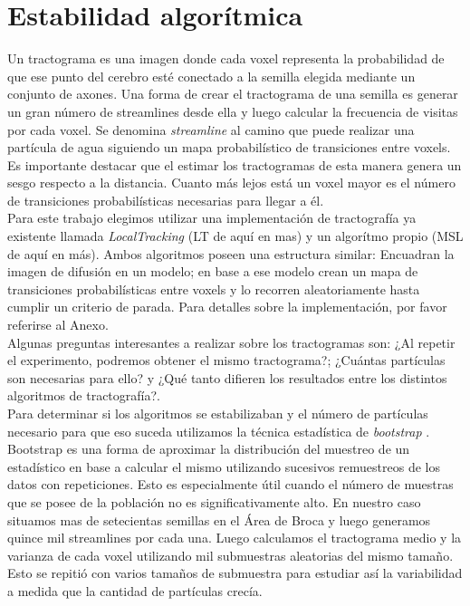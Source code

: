 \section{Estabilidad algor\'itmica}
\label{sec:estabilidad}

Un tractograma es una imagen donde cada voxel representa la probabilidad de que
ese punto del cerebro est\'e conectado a la semilla elegida mediante un conjunto
de axones. Una forma de crear el tractograma de una semilla es generar un gran
n\'umero de streamlines desde ella y luego calcular la frecuencia de visitas por
cada voxel. Se denomina \textit{streamline} al camino que puede realizar una
part\'icula de agua siguiendo un mapa probabil\'istico de transiciones entre voxels.
Es importante destacar que el estimar los tractogramas de esta manera genera un 
sesgo respecto a la distancia. Cuanto m\'as lejos est\'a un voxel mayor es el 
n\'umero de transiciones probabil\'isticas necesarias para llegar a \'el. \\

Para este trabajo elegimos utilizar una implementaci\'on de tractograf\'ia ya 
existente llamada \textit{LocalTracking} (LT de aqu\'i en mas) y un algor\'itmo
propio (MSL de aqu\'i en m\'as). Ambos algoritmos poseen una estructura 
similar: Encuadran la imagen de difusi\'on en un modelo; en base a ese modelo 
crean un mapa de transiciones probabil\'isticas entre voxels y lo recorren 
aleatoriamente hasta cumplir un criterio de parada. Para detalles sobre la 
implementaci\'on, por favor referirse al Anexo. \\

Algunas preguntas interesantes a realizar sobre los tractogramas son: ¿Al repetir
el experimento, podremos obtener el mismo tractograma?; ¿Cu\'antas part\'iculas son
necesarias para ello? y ¿Qu\'e tanto difieren los resultados entre los distintos 
algoritmos de tractograf\'ia?. \\

Para determinar si los algoritmos se estabilizaban y el n\'umero de part\'iculas
necesario para que eso suceda utilizamos la t\'ecnica estad\'istica de
\textit{bootstrap} \cite{Efron1982}. Bootstrap es una forma de aproximar la
distribuci\'on del muestreo de un estad\'istico en base a calcular el mismo
utilizando sucesivos remuestreos de los datos con repeticiones. Esto es
especialmente \'util cuando el n\'umero de muestras que se posee de la poblaci\'on
no es significativamente alto. En nuestro caso situamos mas de setecientas
semillas en el \'Area de Broca y luego generamos quince mil streamlines por cada
una. Luego calculamos el tractograma medio y la varianza de cada voxel utilizando
mil submuestras aleatorias del mismo tama\~no. Esto se repiti\'o con varios
tama\~nos de submuestra para estudiar as\'i la variabilidad a medida que la
cantidad de part\'iculas crec\'ia.\\
